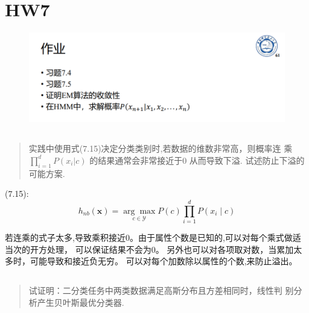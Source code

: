 \documentclass[UTF8,a4paper,AutoFakeBold,AutoFakeSlant]{article}
\begin{document}

\section{HW7}

\begin{figure}[H]
  \centering
  \includegraphics[scale=0.675]{hw7.png}
  \label{f:hw7}
\end{figure}


\subsection{}

\begin{quotation}
  实践中使用式(7.15)决定分类类别时,若数据的维数非常高，则概率连
  乘 $ \prod_{i=1}^{d} P(x_i|c)  $ 的结果通常会非常接近于0 从而导致下溢.
  试述防止下溢的可能方案.
\end{quotation}

(7.15):
\begin{equation*}
  h_{n b}(\boldsymbol{x})=\underset{c \in \mathcal{Y}}{\arg \max } P(c) \prod_{i=1}^{d} P\left(x_{i} \mid c\right)
\end{equation*}

若连乘的式子太多,导致乘积接近0。由于属性个数是已知的,可以对每个乘式做适当次的开方处理，
可以保证结果不会为0。
另外也可以对各项取对数，当累加太多时，可能导致和接近负无穷。
可以对每个加数除以属性的个数,来防止溢出。



\subsection{}

\begin{quotation}
  试证明：二分类任务中两类数据满足高斯分布且方差相同时，线性判
  别分析产生贝叶斯最优分类器.
\end{quotation}
\end{document}
